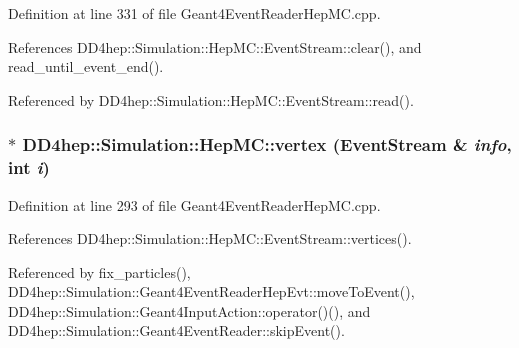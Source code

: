 Definition at line 331 of file Geant4EventReaderHepMC.cpp.

References DD4hep::Simulation::HepMC::EventStream::clear(), and read\_\-until\_\-event\_\-end().

Referenced by DD4hep::Simulation::HepMC::EventStream::read().\hypertarget{namespace_d_d4hep_1_1_simulation_1_1_hep_m_c_a3a13a13dbe2dce0cfbea9607895abf14}{
\subsubsection[{vertex}]{ $\ast$ DD4hep::Simulation::HepMC::vertex (EventStream \& {\em info}, \/  int {\em i})}}
\label{namespace_d_d4hep_1_1_simulation_1_1_hep_m_c_a3a13a13dbe2dce0cfbea9607895abf14}


Definition at line 293 of file Geant4EventReaderHepMC.cpp.

References DD4hep::Simulation::HepMC::EventStream::vertices().

Referenced by fix\_\-particles(), DD4hep::Simulation::Geant4EventReaderHepEvt::moveToEvent(), DD4hep::Simulation::Geant4InputAction::operator()(), and DD4hep::Simulation::Geant4EventReader::skipEvent().